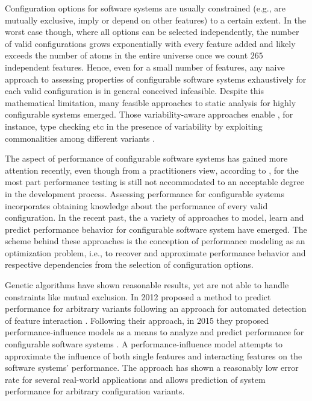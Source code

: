 Configuration options for software systems are usually constrained (e.g., are
mutually exclusive, imply or depend on other features) to a certain extent. In
the worst case though, where all options can be selected independently, the
number of valid configurations grows exponentially with every feature added and
likely exceeds the number of atoms in the entire universe once we count $265$
independent features. Hence, even for a small number of features, any naive
approach to assessing properties of configurable software systems exhaustively
for each valid configuration is in general conceived infeasible. Despite this
mathematical limitation, many feasible approaches to static analysis for highly
configurable systems emerged. Those variability-aware approaches enable , for
instance, {\color{gray} type checking etc} in the presence of variability by
exploiting commonalities among different variants \citep{thum_classification_2014}.

The aspect of performance of configurable software systems has gained more
attention recently, even though from a practitioners view, according to
\cite{molyneaux_art_2014}, for the most part performance testing is still not
accommodated to an acceptable degree in the development process.
Assessing performance for configurable systems incorporates obtaining knowledge about the performance of
every valid configuration. In the recent past, the a variety of approaches to
model, learn and predict performance behavior for configurable software system
have emerged. The scheme behind these approaches is the conception of
performance modeling as an optimization problem, i.e., to recover and
approximate performance behavior and respective dependencies from the selection
of configuration options.

Genetic algorithms \citep{guo_genetic_2011,sayyad_scalable_2013}  have shown
reasonable results, yet are not able to handle constraints like mutual
exclusion. In 2012 \citeauthor{siegmund_predicting_2012} proposed a
method to predict performance for arbitrary variants following an approach for
automated detection of feature interaction \citep{siegmund_predicting_2012}.
Following their approach, in 2015 they proposed performance-influence models as a means
to analyze and predict performance for configurable software systems
\citep{siegmund_performance-influence_2015}. A performance-influence model
attempts to approximate the influence of both single features and interacting
features on the software systems' performance.
The approach has shown a reasonably low error rate for several real-world
applications and allows prediction of system performance for arbitrary
configuration variants.

